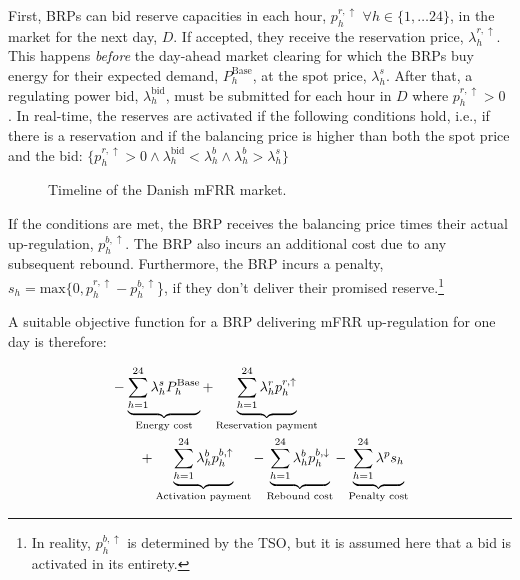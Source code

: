 First, BRPs can bid reserve capacities in each hour, $p_{h}^{r,\uparrow}$ $\forall{h} \in \{1, \ldots 24 \}$, in the market for the next day, $D$. If accepted, they receive the reservation price, $\lambda_{h}^{r,\uparrow}$. This happens \textit{before} the day-ahead market clearing for which the BRPs buy energy for their expected demand, $P_{h}^{\text{Base}}$, at the spot price, $\lambda_{h}^{s}$. After that, a regulating power bid, $\lambda_{h}^{\text{bid}}$, must be submitted for each hour in $D$ where $p_{h}^{r,\uparrow} > 0$ \cite{energinet:Systemydelser}. In real-time, the reserves are activated if the following conditions hold, i.e., if there is a reservation and if the balancing price is higher than both the spot price and the bid: $\{p_{h}^{r,\uparrow} > 0 \land \lambda_{h}^{\text{bid}} <  \lambda_{h}^{b} \land \lambda_{h}^{b} > \lambda_{h}^{s} \}$



\begin{figure}[!t]
    \centering
    
    \caption{Timeline of the Danish mFRR market.}
    \label{fig:timeline_mfrr}
\end{figure}


If the conditions are met, the BRP receives the balancing price times their actual up-regulation, $p_{h}^{b,\uparrow}$. The BRP also incurs an additional cost due to any subsequent rebound. Furthermore, the BRP incurs a penalty, $s_{h} = \text{max}\{0, p_{h}^{r,\uparrow} - p_{h}^{b,\uparrow}$\}, if they don't deliver their promised reserve.\footnote{In reality, $p_{h}^{b,\uparrow}$ is determined by the TSO, but it is assumed here that a bid is activated in its entirety.}

A suitable objective function for a BRP delivering mFRR up-regulation for one day is therefore:

\begin{align}\label{eq:mFRRObjective}
     &  - \underbrace{\sum_{h=1}^{24} \lambda^{s}_{h}P^{\text{Base}}_{h}}_{\textrm{Energy cost}} + \underbrace{\sum_{h=1}^{24}\lambda_{h}^{r} p^{r, \uparrow}_{h}}_{\textrm{Reservation payment}}  \notag \\ & \quad \quad + \underbrace{\sum_{h=1}^{24}  \lambda_{h}^{b} p^{b,\uparrow}_{h}}_{\textrm{Activation payment}} - \underbrace{\sum_{h=1}^{24}  \lambda_{h}^{b} p^{b,\downarrow}_{h}}_{\textrm{Rebound cost}} - \underbrace{ \sum_{h=1}^{24}  \lambda^{p}s_{h}}_{\textrm{Penalty cost}}
\end{align}


